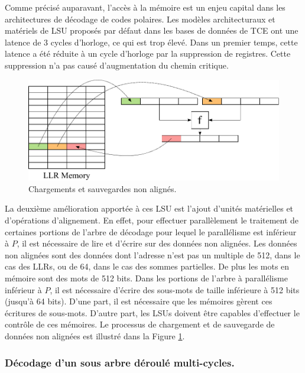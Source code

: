 Comme précisé auparavant, l'accès à la mémoire est un enjeu capital dans les architectures de décodage de codes polaires. Les modèles architecturaux et matériels de LSU proposés par défaut dans les bases de données de TCE ont une latence de 3 cycles d'horloge, ce qui est trop élevé. Dans un premier temps, cette latence a été réduite à un cycle d'horloge par la suppression de registres. Cette suppression n'a pas causé d'augmentation du chemin critique.
\begin{figure}[htp]
	\centering
	\includegraphics[width=\textwidth]{main/ch4_fig/unaligned}
	\caption{Chargements et sauvegardes non alignés.}
	\label{fig:unaligned}
\end{figure}

La deuxième amélioration apportée à ces LSU est l'ajout d'unités matérielles et d'opérations d'alignement. En effet, pour effectuer parallèlement le traitement de certaines portions de l'arbre de décodage pour lequel le parallélisme est inférieur à $P$, il est nécessaire de lire et d'écrire sur des données non alignées. Les données non alignées sont des données dont l'adresse n'est pas un multiple de 512, dans le cas des LLRs, ou de 64, dans le cas des sommes partielles. De plus les mots en mémoire sont des mots de 512 bits. Dans les portions de l'arbre à parallélisme inférieur à $P$, il est nécessaire d'écrire des sous-mots de taille inférieure à 512 bits (jusqu'à 64 bits). D'une part, il est nécessaire que les mémoires gèrent ces écritures de sous-mots. D'autre part, les LSUs doivent être capables d'effectuer le contrôle de ces mémoires. Le processus de chargement et de sauvegarde de données non alignées est illustré dans la Figure \ref{fig:unaligned}.

\subsubsection{Décodage d'un sous arbre déroulé multi-cycles.}

